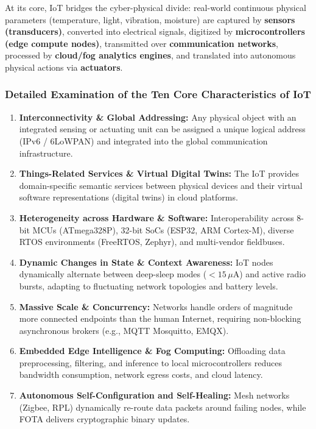 \documentclass[11pt,a4paper]{article}
\begin{document}
At its core, IoT bridges the cyber-physical divide: real-world continuous physical parameters (temperature, light, vibration, moisture) are captured by \textbf{sensors (transducers)}, converted into electrical signals, digitized by \textbf{microcontrollers (edge compute nodes)}, transmitted over \textbf{communication networks}, processed by \textbf{cloud/fog analytics engines}, and translated into autonomous physical actions via \textbf{actuators}.

\subsubsection{Detailed Examination of the Ten Core Characteristics of IoT}
\begin{enumerate}[leftmargin=*]
    \item \textbf{Interconnectivity \& Global Addressing:} Any physical object with an integrated sensing or actuating unit can be assigned a unique logical address (IPv6 / 6LoWPAN) and integrated into the global communication infrastructure.
    \item \textbf{Things-Related Services \& Virtual Digital Twins:} The IoT provides domain-specific semantic services between physical devices and their virtual software representations (digital twins) in cloud platforms.
    \item \textbf{Heterogeneity across Hardware \& Software:} Interoperability across 8-bit MCUs (ATmega328P), 32-bit SoCs (ESP32, ARM Cortex-M), diverse RTOS environments (FreeRTOS, Zephyr), and multi-vendor fieldbuses.
    \item \textbf{Dynamic Changes in State \& Context Awareness:} IoT nodes dynamically alternate between deep-sleep modes ($<15\,\mu\text{A}$) and active radio bursts, adapting to fluctuating network topologies and battery levels.
    \item \textbf{Massive Scale \& Concurrency:} Networks handle orders of magnitude more connected endpoints than the human Internet, requiring non-blocking asynchronous brokers (e.g., MQTT Mosquitto, EMQX).
    \item \textbf{Embedded Edge Intelligence \& Fog Computing:} Offloading data preprocessing, filtering, and inference to local microcontrollers reduces bandwidth consumption, network egress costs, and cloud latency.
    \item \textbf{Autonomous Self-Configuration and Self-Healing:} Mesh networks (Zigbee, RPL) dynamically re-route data packets around failing nodes, while FOTA delivers cryptographic binary updates.

\end{enumerate}
\end{document}
